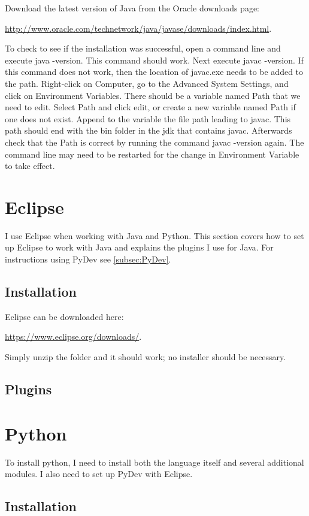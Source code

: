 \documentclass{article}
\newcommand{\web}[2]{
	\begin{center}
		\url{#1}{#2}
	\end{center}
}
\begin{document}
Download the latest version of Java from the Oracle downloads page:
 	\web{http://www.oracle.com/technetwork/java/javase/downloads/index.html}.
To check to see if the installation was successful, open a command line and execute java -version.
This command should work.
Next execute javac -version.
If this command does not work, then the location of javac.exe needs to be added to the path.
Right-click on Computer, go to the Advanced System Settings, and click on Environment Variables.
There should be a variable named Path that we need to edit.
Select Path and click edit, or create a new variable named Path if one does not exist.
Append to the variable the file path leading to javac.
This path should end with the bin folder in the jdk that contains javac.
Afterwards check that the Path is correct by running the command javac -version again.
The command line may need to be restarted for the change in Environment Variable to take effect.

\section{Eclipse}

I use Eclipse when working with Java and Python.
This section covers how to set up Eclipse to work with Java and explains the plugins I use for Java.
For instructions using PyDev see \cref{subsec:PyDev}.

\subsection{Installation}
Eclipse can be downloaded here:
	\web{https://www.eclipse.org/downloads/}.
Simply unzip the folder and it should work; no installer should be necessary.

\subsection{Plugins}

\section{Python}

To install python, I need to install both the language itself and several additional modules.
I also need to set up PyDev with Eclipse.

\subsection{Installation}
\end{document}

